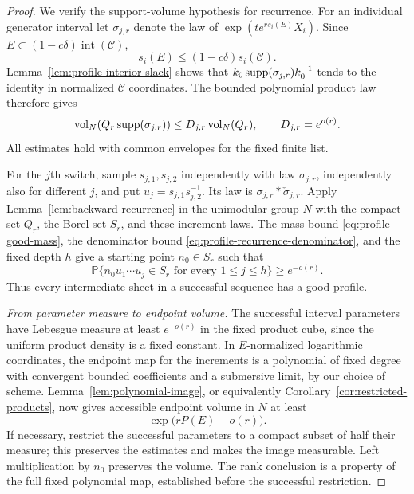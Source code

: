 \begin{proof}
We verify the support-volume hypothesis for recurrence.  For an
individual generator interval let $\sigma_{j,r}$ denote the law
of $\exp(t e^{rs_i(E)}X_i)$.  Since
$E\subset(1-c\delta)\operatorname{int}(\mathcal C)$,
\[
 s_i(E)\le(1-c\delta)s_i(\mathcal C).
\]
Lemma~\ref{lem:profile-interior-slack} shows that
$k_0\operatorname{supp}(\sigma_{j,r})k_0^{-1}$ tends to the identity in normalized
$\mathcal C$ coordinates.  The bounded polynomial product law
therefore gives
\begin{equation}\label{eq:profile-recurrence-denominator}
 \operatorname{vol}_N(Q_r\operatorname{supp}(\sigma_{j,r}))
       \le D_{j,r}\operatorname{vol}_N(Q_r),\qquad D_{j,r}=e^{o(r)}.
\end{equation}
All estimates hold with common envelopes for the fixed finite list.

For the $j$th switch, sample $s_{j,1},s_{j,2}$ independently with law
$\sigma_{j,r}$, independently also for different $j$, and put
$u_j=s_{j,1}s_{j,2}^{-1}$.  Its law is
$\sigma_{j,r}*\check\sigma_{j,r}$.
Apply Lemma~\ref{lem:backward-recurrence} in the unimodular group $N$
with the compact set $Q_r$, the Borel set $S_r$, and these increment
laws.  The mass bound \eqref{eq:profile-good-mass}, the denominator
bound \eqref{eq:profile-recurrence-denominator}, and the fixed depth
$h$ give a starting point $n_0\in S_r$ such that
\[
 \mathbb P\{n_0u_1\cdots u_j\in S_r
                   \text{ for every }1\le j\le h\}\ge e^{-o(r)}.
\]
Thus every intermediate sheet in a successful sequence has a good
profile.

\emph{From parameter measure to endpoint volume.}
The successful interval parameters have
Lebesgue measure at least $e^{-o(r)}$ in the fixed product cube,
since the uniform product density is a fixed constant.  In
$E$-normalized logarithmic coordinates, the endpoint map for the
increments is a polynomial of fixed degree with convergent bounded
coefficients and a submersive limit, by our choice of scheme.
Lemma~\ref{lem:polynomial-image}, or equivalently
Corollary~\ref{cor:restricted-products}, now gives accessible
endpoint volume in $N$ at least
\begin{equation}\label{eq:profile-accessible-volume}
 \exp\bigl(rP(E)-o(r)\bigr).
\end{equation}
If necessary, restrict the successful parameters to a compact subset
of half their measure; this preserves the estimates and makes the
image measurable.  Left multiplication by $n_0$ preserves the
volume.  The rank conclusion is a property of the full fixed
polynomial map, established before the successful restriction.


\end{proof}
